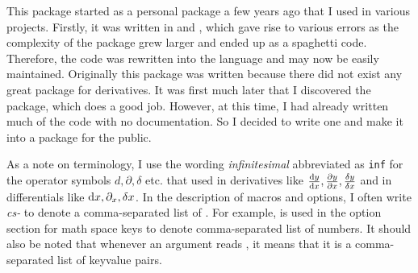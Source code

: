 \listfiles

\setlength{\marginparwidth}{126pt} %
\setlength{\marginparpush}{0pt} %

\makeindex[name = option, title = Index of Options, intoc=true]
\makeindex[name = macro, title = Index of Commands, intoc=true]


\def\indexspace{}



	
	
	\clearpage
	\tableofcontents
	
	\clearpage
	This package started as a personal package a few years ago that I used in various projects. Firstly, it was written in \tex{} and \latex, which gave rise to various errors as the complexity of the package grew larger and ended up as a spaghetti code. Therefore, the code was rewritten into the  language and may now be easily maintained. Originally this package was written because there did not exist any great package for derivatives. It was first much later that I discovered the  package, which does a good job. However, at this time, I had already written much of the code with no documentation. So I decided to write one and make it into a package for the public.
	
	As a note on terminology, I use the wording \emph{infinitesimal} abbreviated as \texttt{inf} for the operator symbols $d, \partial, \delta$ etc. that used in derivatives like $\odv{y}{x}, \pdv{y}{x}, \fdv{y}{x}$ and in differentials like $\odif{x}, \pdif{x}, \fdif{x}$. In the description of macros and options, I often write \emph{cs-} to denote a comma-separated list of . For example,  is used in the option section for math space keys to denote comma-separated list of numbers. It should also be noted that whenever an argument reads , it means that it is a comma-separated list of keyvalue pairs.
	
